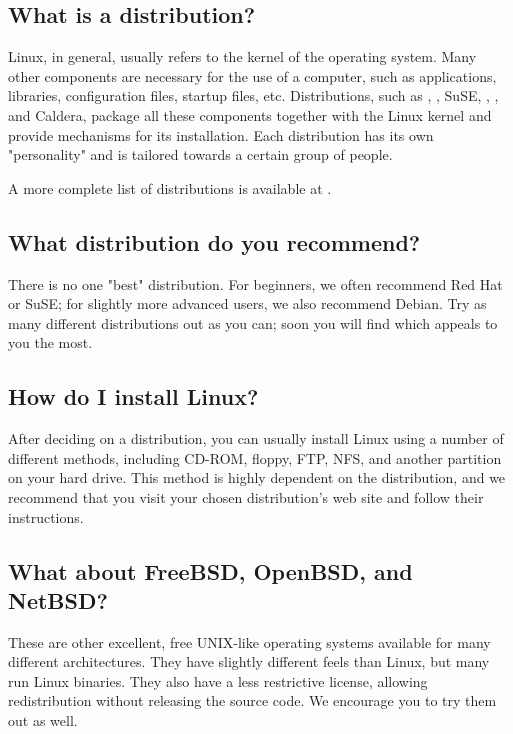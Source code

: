 \documentclass[a4paper]{article}
\begin{document}
\subsection{What is a distribution?}

Linux, in general, usually refers to the kernel of the operating
system.  Many other components are necessary for the use of a computer,
such as applications, libraries, configuration files, startup files,
etc.  Distributions, such as
,
,
SuSE,
,
, 
and Caldera, package all these components together with the Linux kernel
and provide mechanisms for its installation.  Each distribution has its
own "personality" and is tailored towards a certain group of people.

A more complete list of distributions is available at .




\subsection{What distribution do you recommend?}

There is no one "best" distribution.  For beginners, we often recommend
Red Hat or SuSE; for slightly more advanced users, we also recommend
Debian.  Try as many different distributions out as you can; soon you
will find which appeals to you the most.




\subsection{How do I install Linux?}

After deciding on a distribution, you can usually install Linux using a
number of different methods, including CD-ROM, floppy, FTP, NFS, and
another partition on your hard drive.  This method is highly dependent
on the distribution, and we recommend that you visit your chosen
distribution's web site and follow their instructions.




\subsection{What about FreeBSD, OpenBSD, and NetBSD?}

These are other excellent, free UNIX-like operating systems available
for many different architectures.  They have slightly different feels
than Linux, but many run Linux binaries.  They also have a less
restrictive license, allowing redistribution without releasing the
source code.  We encourage you to try them out as well.
\end{document}
